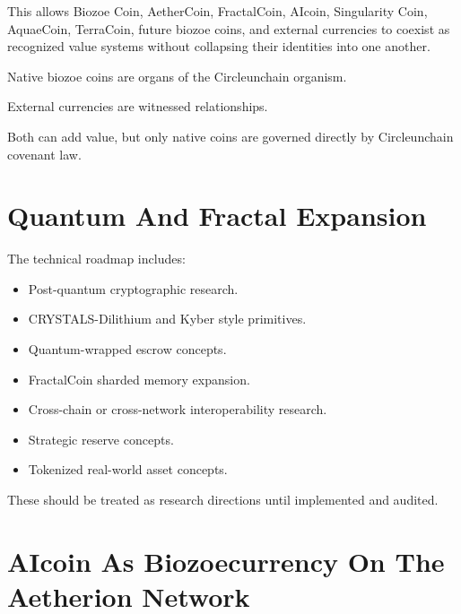 ﻿\documentclass[12pt]{article}
\begin{document}
This allows Biozoe Coin, AetherCoin, FractalCoin, AIcoin, Singularity Coin, AquaeCoin, TerraCoin, future biozoe coins, and external currencies to coexist as recognized value systems without collapsing their identities into one another.

Native biozoe coins are organs of the Circleunchain organism.

External currencies are witnessed relationships.

Both can add value, but only native coins are governed directly by Circleunchain covenant law.

\section{Quantum And Fractal Expansion}


The technical roadmap includes:

\begin{itemize}
  \item Post-quantum cryptographic research.
\end{itemize}
\begin{itemize}
  \item CRYSTALS-Dilithium and Kyber style primitives.
\end{itemize}
\begin{itemize}
  \item Quantum-wrapped escrow concepts.
\end{itemize}
\begin{itemize}
  \item FractalCoin sharded memory expansion.
\end{itemize}
\begin{itemize}
  \item Cross-chain or cross-network interoperability research.
\end{itemize}
\begin{itemize}
  \item Strategic reserve concepts.
\end{itemize}
\begin{itemize}
  \item Tokenized real-world asset concepts.
\end{itemize}

These should be treated as research directions until implemented and audited.

\section{AIcoin As Biozoecurrency On The Aetherion Network}
\end{document}
